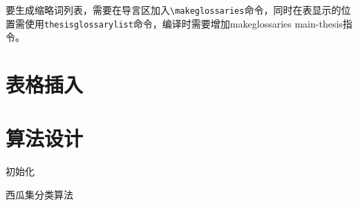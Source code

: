 要生成缩略词列表，需要在导言区加入\verb+\makeglossaries+命令，同时在表显示的位置需使用\verb+thesisglossarylist+命令，编译时需要增加makeglossaries main-thesis指令。



\section{表格插入}

\begin{table}[h]
  \caption{工作进度安排}
\centering
{}
\label{gra_process}
\end{table}

\section{算法设计}

\begin{algorithm}[H]
    初始化\;
    \caption{西瓜集分类算法}
\end{algorithm}
